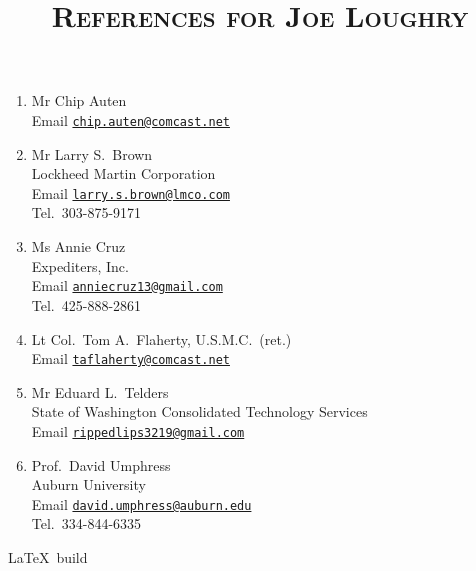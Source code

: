 \documentclass[12pt,letterpaper]{article}
\date{}
\title{\textsc{References for Joe Loughry}}
\author{}
\begin{document}
\maketitle
\thispagestyle{empty}

\begin{enumerate}

	\item Mr Chip Auten \\
		Email \href{mailto:chip.auten@comcast.net}{\nolinkurl{chip.auten@comcast.net}}

	\item Mr Larry S.~Brown \\
		Lockheed Martin Corporation \\
		Email \href{mailto:larry.s.brown@lmco.com}{\nolinkurl{larry.s.brown@lmco.com}} \\
		Tel.\ 303-875-9171

	\item Ms Annie Cruz \\
		Expediters, Inc. \\
		Email \href{mailto:anniecruz13@gmail.com}{\nolinkurl{anniecruz13@gmail.com}} \\
		Tel.\ 425-888-2861

	\item Lt Col.\ Tom A.~Flaherty, U.S.M.C.~(ret.) \\
		Email \href{mailto:taflaherty@comcast.net}{\nolinkurl{taflaherty@comcast.net}}

	\item Mr Eduard L.~Telders \\
		State of Washington Consolidated Technology Services \\
		Email \href{mailto:rippedlips3219@gmail.com}{\nolinkurl{rippedlips3219@gmail.com}}

	\item Prof.\ David Umphress \\
		Auburn University \\
		Email \href{mailto:david.umphress@auburn.edu}{\nolinkurl{david.umphress@auburn.edu}} \\
		Tel.\ 334-844-6335 

\end{enumerate}

\vfill
{\tiny \LaTeX\ build }
\end{document}
